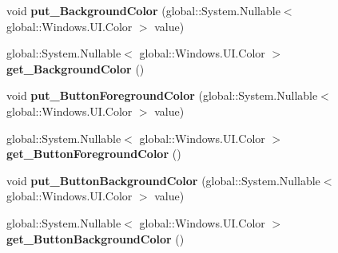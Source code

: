 \begin{DoxyCompactItemize}
\item 
\mbox{\label{class_windows_1_1_u_i_1_1_view_management_1_1_application_view_title_bar_a72763c5790a08759eb3aa7f1a034cc1c}} 
void {\bfseries put\+\_\+\+Background\+Color} (global\+::\+System.\+Nullable$<$ global\+::\+Windows.\+U\+I.\+Color $>$ value)
\item 
\mbox{\label{class_windows_1_1_u_i_1_1_view_management_1_1_application_view_title_bar_a10d72a066c2702f38e96eb1f3702b5ab}} 
global\+::\+System.\+Nullable$<$ global\+::\+Windows.\+U\+I.\+Color $>$ {\bfseries get\+\_\+\+Background\+Color} ()
\item 
\mbox{\label{class_windows_1_1_u_i_1_1_view_management_1_1_application_view_title_bar_a607b5d86c746c6283c118cc8e983990a}} 
void {\bfseries put\+\_\+\+Button\+Foreground\+Color} (global\+::\+System.\+Nullable$<$ global\+::\+Windows.\+U\+I.\+Color $>$ value)
\item 
\mbox{\label{class_windows_1_1_u_i_1_1_view_management_1_1_application_view_title_bar_aae493d2a3fa93365f753e29b776af821}} 
global\+::\+System.\+Nullable$<$ global\+::\+Windows.\+U\+I.\+Color $>$ {\bfseries get\+\_\+\+Button\+Foreground\+Color} ()
\item 
\mbox{\label{class_windows_1_1_u_i_1_1_view_management_1_1_application_view_title_bar_a4bf81ad5fba26dac4114c2caf024a7a9}} 
void {\bfseries put\+\_\+\+Button\+Background\+Color} (global\+::\+System.\+Nullable$<$ global\+::\+Windows.\+U\+I.\+Color $>$ value)
\item 
\mbox{\label{class_windows_1_1_u_i_1_1_view_management_1_1_application_view_title_bar_a7e47596433a77023cf07c95e096f0a1c}} 
global\+::\+System.\+Nullable$<$ global\+::\+Windows.\+U\+I.\+Color $>$ {\bfseries get\+\_\+\+Button\+Background\+Color} ()
\item 
\mbox{\label{class_windows_1_1_u_i_1_1_view_management_1_1_application_view_title_bar_a81367f4399734083a0312e932602d91a}} 

\end{DoxyCompactItemize}
